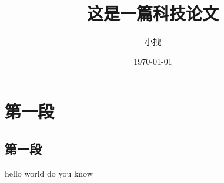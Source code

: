 \documentclass{article}
\title{这是一篇科技论文}
\date{\today}
\author{小拽}
\begin{document}
\maketitle
\section{第一段}
\subsection{第一段}
hello world do you know
\end{document}
